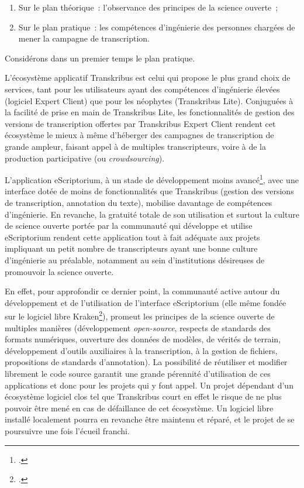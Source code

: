 \documentclass[a4paper,12pt,twoside]{book}
\begin{document}
				\begin{enumerate}
					\item Sur le plan théorique~: l'observance des principes de la science ouverte~;
					\item Sur le plan pratique~: les compétences d'ingénierie des personnes chargées de mener la campagne de transcription.
				\end{enumerate}
				
				Considérons dans un premier temps le plan pratique.
				
				L'écosystème applicatif Transkribus est celui qui propose le plus grand choix de services, tant pour les utilisateurs ayant des compétences d'ingénierie élevées (logiciel Expert Client) que pour les néophytes (Transkribus Lite). Conjuguées à la facilité de prise en main de Transkribus Lite, les fonctionnalités de gestion des versions de transcription offertes par Transkribus Expert Client rendent cet écosystème le mieux à même d'héberger des campagnes de transcription de grande ampleur, faisant appel à de multiples transcripteurs, voire à de la production participative (ou \textit{crowdsourcing}).
				
				L'application eScriptorium, à un stade de développement moins avancé\footcite{stokesEScriptoriumVREManuscript2021}, avec une interface dotée de moins de fonctionnalités que Transkribus (gestion des versions de transcription, annotation du texte), mobilise davantage de compétences d'ingénierie. En revanche, la gratuité totale de son utilisation et surtout la culture de science ouverte portée par la communauté qui développe et utilise eScriptorium rendent cette application tout à fait adéquate aux projets impliquant un petit nombre de transcripteurs ayant une bonne culture d'ingénierie au préalable, notamment au sein d'institutions désireuses de promouvoir la science ouverte.
				
				En effet, pour approfondir ce dernier point, la communauté active autour du développement et de l'utilisation de l'interface eScriptorium (elle même fondée sur le logiciel libre Kraken\footcite{KrakenDocumentation}), promeut les principes de la science ouverte de multiples manières (développement \textit{open-source}, respects de standards des formats numériques, ouverture des données de modèles, de vérités de terrain, développement d'outils auxiliaires à la transcription, à la gestion de fichiers, propositions de standards d'annotation). La possibilité de réutiliser et modifier librement le code source garantit une grande pérennité d'utilisation de ces applications et donc pour les projets qui y font appel. Un projet dépendant d'un écosystème logiciel clos tel que Transkribus court en effet le risque de ne plus pouvoir être mené en cas de défaillance de cet écosystème. Un logiciel libre installé localement pourra en revanche être maintenu et réparé, et le projet de se poursuivre une fois l'écueil franchi.
				
\end{document}
